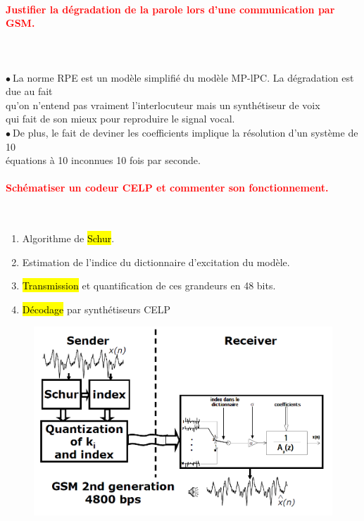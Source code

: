 \documentclass[letterpaper, 12pt]{article}
\newcommand{\alinea}{
\hspace*{0.3cm}}
\newcommand{\red}[1]{
	\textcolor{red}{#1}
}
\newcommand{\point}{$\bullet\ $}
\begin{document}
		\paragraph{\red{Justifier la dégradation de la parole lors d'une communication par GSM.}}~\\~\\
			\point La norme RPE est un modèle simplifié du modèle MP-lPC. La dégradation est due au fait
				\\\alinea qu'on n'entend pas vraiment l'interlocuteur mais un synthétiseur de voix
				\\\alinea qui fait de son mieux pour reproduire le signal vocal. \\
			\point De plus, le fait de deviner les coefficients implique la résolution d'un système de 10
				\\\alinea équations à 10 inconnues 10 fois par seconde. 
		
		\paragraph{\red{Schématiser un codeur CELP et commenter son fonctionnement.}}~\\
			\begin{minipage}{0.4\textwidth}
				\begin{enumerate}
					\setlength{\itemsep}{0pt}		
					\setlength{\parskip}{0pt}		
					\setlength{\parsep}{0pt}	
					\item Algorithme de \hl{Schur}.
					\item Estimation de l'indice du dictionnaire d'excitation du modèle.
					\item \hl{Transmission} et quantification de ces grandeurs en 48 bits.
					\item \hl{D\'ecodage} par synthétiseurs CELP
				\end{enumerate}
			\end{minipage}\hfill
			\begin{minipage}{0.55\textwidth}
				\begin{figure}[H]
					\centering
					\includegraphics[scale=0.35]{Images/coder-celp}
				\end{figure}\noindent
			\end{minipage}
\end{document}
